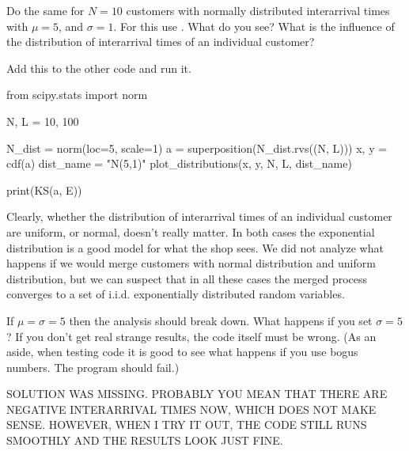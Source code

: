 \documentclass{scrartcl}
\begin{document}
\begin{exercise}
Do the same for $N=10$ customers with normally distributed interarrival times with $\mu=5$, and $\sigma =1$.
For this use . What do you see? What is the influence of the distribution of interarrival times of an individual customer? 
\begin{solution}
Add this to the other code and run it. 
\begin{pyverbatim}
from scipy.stats import norm

N, L = 10, 100

N_dist = norm(loc=5, scale=1)
a = superposition(N_dist.rvs((N, L)))
x, y = cdf(a)
dist_name = "N(5,1)"
plot_distributions(x, y, N, L, dist_name)

print(KS(a, E))
\end{pyverbatim}

Clearly, whether the distribution of interarrival times of an individual customer are uniform, or normal, doesn't really matter. In both cases the exponential distribution is a good model for what the shop sees. We did not analyze what happens if we would merge customers with normal distribution and uniform distribution, but we can suspect that in all these cases the merged process converges to a set of i.i.d. exponentially distributed random variables.

\end{solution}
\end{exercise}

\begin{exercise}
If  $\mu=\sigma=5$ then the analysis should break down. What happens if you set $\sigma=5$? If you don't get real strange results, the code itself must be wrong. (As an aside, when testing code it is good to see what happens if you use bogus numbers. The program should fail.)
\begin{solution}
	SOLUTION WAS MISSING. PROBABLY YOU MEAN THAT THERE ARE NEGATIVE INTERARRIVAL TIMES NOW, WHICH DOES NOT MAKE SENSE. HOWEVER, WHEN I TRY IT OUT, THE CODE STILL RUNS SMOOTHLY AND THE RESULTS LOOK JUST FINE.
\end{solution}	
\end{exercise}
\end{document}
